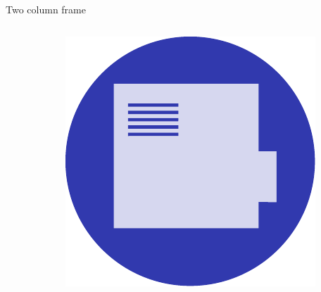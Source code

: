 \documentclass{beamer}
\begin{document}
\begin{frame}[t]{Two column frame}
    \begin{columns}[b]
    \begin{column}{0.65\textwidth}
        \lipsum[23]
    \end{column}
    \begin{column}{0.3\textwidth}
        \includegraphics[width=.9\linewidth]{../images/beamerlogo}
    \end{column}
    \end{columns}
\end{frame}
\end{document}
